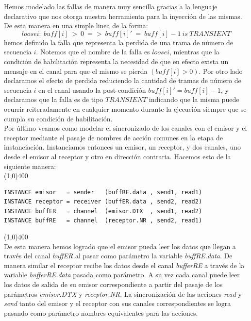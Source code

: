 \documentclass[titlepage, 12pt]{book}
\begin{document}
Hemos modelado las fallas de manera muy sencilla gracias a la lenguaje declarativo que nos otorga nuestra herramienta para la inyección de las mismas. De esta manera en una simple linea de la forma: $$ loosei:~buff[i]~>~0~=>~buff[i]'~=~buff[i]-1~is~TRANSIENT $$ hemos definido la falla que representa la perdida de una trama de número de secuencia $i$. Notemos que el nombre de la falla es $loosei$, mientras que la condición de habilitación representa la necesidad de que en efecto exista un mensaje en el canal para que el mismo se pierda $( buff[i] > 0 )$. Por otro lado declaramos el efecto de perdida reduciendo la cantidad de tramas de número de secuencia $i$ en el canal usando la post-condición $buff[i]' = buff[i]-1$, y declaramos que la falla es de tipo $TRANSIENT$ indicando que la misma puede ocurrir reiteradamente en cualquier momento durante la ejecución siempre que se cumpla su condición de habilitación.\\

Por último veamos como modelar el sincronizado de los canales con el emisor y el receptor mediante el pasaje de nombres de acción comunes en la etapa de instanciación. Instanciamos entonces un emisor, un receptor, y dos canales, uno desde el emisor al receptor y otro en dirección contraria. Hacemos esto de la siguiente manera:\\

\noindent \line(1,0){400}
\begin{verbatim}
INSTANCE emisor   = sender   (buffRE.data , send1, read1)
INSTANCE receptor = receiver (buffER.data , send2, read2)
INSTANCE buffER   = channel  (emisor.DTX  , send1, read2)
INSTANCE buffRE   = channel  (receptor.NR , send2, read1)
\end{verbatim}
\noindent \line(1,0){400}\\

De esta manera hemos logrado que el emisor pueda leer los datos que llegan a través del canal \textit{buffER} al pasar como parámetro la variable \textit{buffRE.data}. De manera similar el receptor recibe los datos desde el canal \textit{bufferRE} a través de la variable \textit{bufferRE.data} pasada como parámetro. A su vez cada canal puede leer los datos de salida de su emisor correspondiente a partir del pasaje de los parámetros \textit{emisor.DTX} y \textit{receptor.NR}. La sincronización de las acciones \textit{read} y \textit{send} tanto del emisor y el receptor con sus canales correspondientes se logra pasando como parámetro nombres equivalentes para las acciones.\\
\end{document}
